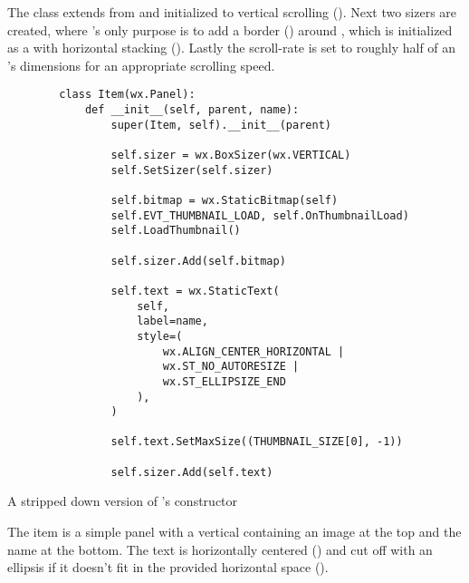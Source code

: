 
The  class extends from  and
initialized to vertical scrolling (). Next
two sizers are created, where 's only purpose is to add a
border () around
, which is initialized as a  with horizontal
stacking (). Lastly the scroll-rate is set
to roughly half of an 's dimensions for an appropriate scrolling
speed.

\begin{listing}[p]
	\begin{verbatim}
		class Item(wx.Panel):
			def __init__(self, parent, name):
				super(Item, self).__init__(parent)

				self.sizer = wx.BoxSizer(wx.VERTICAL)
				self.SetSizer(self.sizer)

				self.bitmap = wx.StaticBitmap(self)
				self.EVT_THUMBNAIL_LOAD, self.OnThumbnailLoad)
				self.LoadThumbnail()

				self.sizer.Add(self.bitmap)

				self.text = wx.StaticText(
					self,
					label=name,
					style=(
						wx.ALIGN_CENTER_HORIZONTAL |
						wx.ST_NO_AUTORESIZE |
						wx.ST_ELLIPSIZE_END
					),
				)

				self.text.SetMaxSize((THUMBNAIL_SIZE[0], -1))

				self.sizer.Add(self.text)
	\end{verbatim}
	\caption{A stripped down version of 's constructor}
	\label{lst:mod:itemview:item}
\end{listing}


The item is a simple panel with a vertical  containing an
image at the top and the name at the bottom. The text is horizontally centered
() and cut off with an ellipsis if it
doesn't fit in the provided horizontal space ().


